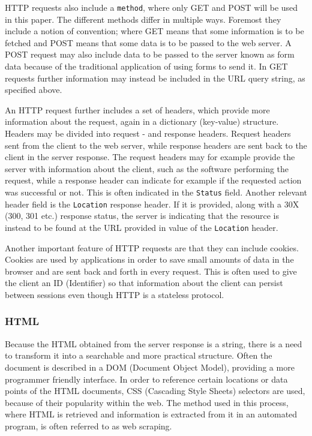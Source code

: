 \documentclass{article}
\begin{document}
	HTTP requests also include a \texttt{method}, where only GET and POST will be used in this paper. The different methods differ in multiple ways. Foremost they include a notion of convention; where GET means that some information is to be fetched and POST means that some data is to be passed to the web server. A POST request may also include data to be passed to the server known as form data because of the traditional application of using forms to send it. In GET requests further information may instead be included in the URL query string, as specified above.
	
	An HTTP request further includes a set of headers, which provide more information about the request, again in a dictionary (key-value) structure. Headers may be divided into request - and response headers. Request headers sent from the client to the web server, while response headers are sent back to the client in the server response. The request headers may for example provide the server with information about the client, such as the software performing the request, while a response header can indicate for example if the requested action was successful or not. This is often indicated in the \texttt{Status} field. Another relevant header field is the \texttt{Location} response header. If it is provided, along with a 30X (300, 301 etc.) response status, the server is indicating that the resource is instead to be found at the URL provided in value of the \texttt{Location} header.\cite{wikipedia http request}\cite{wikipedia url}
	
	Another important feature of HTTP requests are that they can include cookies. Cookies are used by applications in order to save small amounts of data in the browser and are sent back and forth in every request. This is often used to give the client an ID (Identifier) so that information about the client can persist between sessions even though HTTP is a stateless protocol.\cite{wikipedia cookie}
	
	\subsubsection{HTML}
	Because the HTML obtained from the server response is a string, there is a need to transform it into a searchable and more practical structure. Often the document is described in a DOM (Document Object Model), providing a more programmer friendly interface. In order to reference certain locations or data points of the HTML documents, CSS (Cascading Style Sheets) selectors are used, because of their popularity within the web. The method used in this process, where HTML is retrieved and information is extracted from it in an automated program, is often referred to as web scraping.\cite{wikipedia css}\cite{wikipedia web scraping}
	
\end{document}
